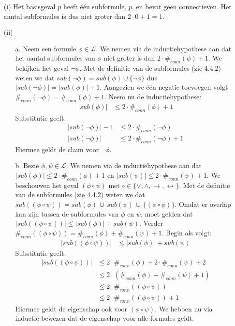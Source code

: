 \begin{enumerate}
	  \begin{itemize}
		\item[(i)] Het basisgeval $p$ heeft één subformule, $p$, en bevat geen connectieven.
		  Het aantal subformules is dus niet groter dan $2 \cdot 0 + 1 = 1$.
		\item[(ii)]
		  \begin{itemize}
			\item [a.] Neem een formule $\phi\in\mathcal{L}$.
			  We nemen via de inductiehypothese aan dat het aantal subformules van $\phi$ niet groter is dan $2\cdot \#_{conn}(\phi) + 1$.
			  We bekijken het geval $\neg\phi$.
			  Met de definitie van de subformules (zie 4.4.2) weten we dat
			  $sub(\neg\phi) = sub(\phi) \cup \{\neg\phi\}$ dus $|sub(\neg\phi)| = |sub(\phi)| + 1$.
			  Aangezien we één negatie toevoegen volgt
			  $\#_{conn}(\neg\phi) = \#_{conn}(\phi) + 1$.
			  Neem nu de inductiehypothese:
			  \begin{align*}
				|sub(\phi)| &\leq 2\cdot \#_{conn}(\phi) + 1
			  \end{align*}
			  Substitutie geeft:
			  \begin{align*}
				|sub(\neg\phi)| - 1 &\leq 2\cdot \#_{conn}(\neg\phi) \\
				|sub(\neg\phi)| &\leq 2\cdot \#_{conn}(\neg\phi) + 1
			  \end{align*}
			  Hiermee geldt de claim voor $\neg\phi$.

			\item [b.] Bezie
			  $\phi, \psi \in \mathcal{L}$.
			  We nemen via de inductiehypothese aan dat
			  $|sub(\phi)|\leq 2\cdot \#_{conn}(\phi)+1$
			  en
			  $|sub(\psi)|\leq 2\cdot \#_{conn}(\psi)+1$.
			  We beschouwen het geval $(\phi\circ\psi)$ met
			  $\circ\in\{\vee,\wedge,\to,\leftrightarrow\}$.
			  Met de definitie van de subformules (zie 4.4.2) weten we dat
			  $sub((\phi \circ \psi))=sub(\phi) \, \cup \, sub(\psi) \, \cup \, \{ (\phi\circ\phi)\}$.
			  Omdat er overlap kan zijn tussen de subformules van $\phi$ en $\psi$, moet gelden dat
			  $|sub((\phi \circ \psi))|\leq |sub(\phi)| + sub(\psi)$.
			  Verder
			  $\#_{conn}((\phi \circ \psi)) = \#_{conn}(\phi) + \#_{conn}(\psi) + 1$.
			  Begin als volgt:
			  \begin{align*}
				|sub((\phi \circ \psi))| &\leq |sub(\phi)| + sub(\psi)
			  \end{align*}
			  Substitutie geeft:
			  \begin{align*}
				|sub((\phi \circ \psi))| &\leq 2\cdot \#_{conn}(\phi) + 2\cdot \#_{conn}(\psi) + 2 \\
										 &\leq 2 \cdot (\#_{conn}(\phi) + \#_{conn}(\psi) + 1)\\
										 &\leq 2 \cdot \#_{conn}((\phi \circ \psi)) \\
										 &\leq 2 \cdot \#_{conn}((\phi \circ \psi)) + 1
			  \end{align*}
			  Hiermee geldt de eigenschap ook voor $(\phi \circ \psi)$.
			  We hebben nu via inductie bewezen dat de eigenschap voor alle formules geldt.
		  \end{itemize}
	  \end{itemize}


\end{enumerate}
